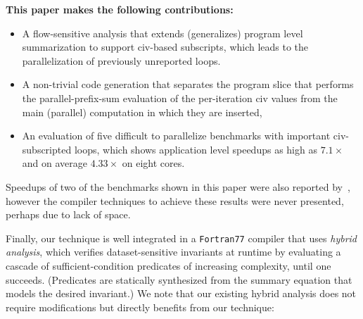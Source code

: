 \documentclass{sig-alternate}
\begin{document}


{\bf This paper makes the following contributions:}
\begin{itemize}
    \item A flow-sensitive analysis that extends (generalizes) 
            program level summarization to support {\sc civ}-based 
            subscripts, which leads to the parallelization of
            previously unreported loops.

    \item A non-trivial code generation that separates the 
            program slice that performs the parallel-prefix-sum
            evaluation of the per-iteration {\sc civ} values 
            from the main (parallel) computation in which 
            they are inserted,

    \item An evaluation of five difficult to parallelize benchmarks 
            with important {\sc civ}-subscripted loops, which
            shows application level speedups as high as 
            $7.1\times$ and on average $4.33\times$ on eight cores.
%
\end  {itemize}

Speedups of two of the benchmarks shown
in this paper were also reported by~\cite{CosPLDI}, however
the compiler techniques to achieve these results were 
never presented, perhaps due to lack of space.


Finally, our technique is well integrated %
in a {\tt Fortran77} compiler that uses {\em hybrid analysis}, 
which verifies dataset-sensitive invariants %
at runtime by evaluating a cascade of sufficient-condition 
predicates of increasing complexity, until one succeeds. 
(Predicates are statically synthesized from the summary 
equation that models the desired invariant.)
%
We note that our existing hybrid analysis does not require modifications
but directly benefits from our technique: 
\end{document}
